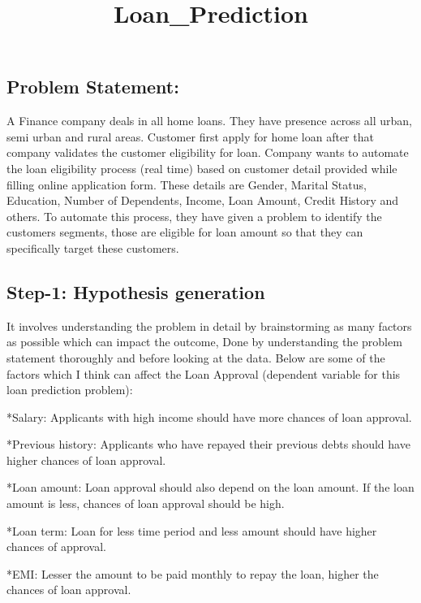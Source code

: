 \documentclass[11pt]{article}
\title{Loan\_Prediction}
\begin{document}
    
    
    \maketitle
    
    

    
    \subsection{Problem Statement:}\label{problem-statement}

A Finance company deals in all home loans. They have presence across all
urban, semi urban and rural areas. Customer first apply for home loan
after that company validates the customer eligibility for loan. Company
wants to automate the loan eligibility process (real time) based on
customer detail provided while filling online application form. These
details are Gender, Marital Status, Education, Number of Dependents,
Income, Loan Amount, Credit History and others. To automate this
process, they have given a problem to identify the customers segments,
those are eligible for loan amount so that they can specifically target
these customers.

    \subsection{Step-1: Hypothesis
generation}\label{step-1-hypothesis-generation}

    It involves understanding the problem in detail by brainstorming as many
factors as possible which can impact the outcome, Done by understanding
the problem statement thoroughly and before looking at the data. Below
are some of the factors which I think can affect the Loan Approval
(dependent variable for this loan prediction problem):

*Salary: Applicants with high income should have more chances of loan
approval.

*Previous history: Applicants who have repayed their previous debts
should have higher chances of loan approval.

*Loan amount: Loan approval should also depend on the loan amount. If
the loan amount is less, chances of loan approval should be high.

*Loan term: Loan for less time period and less amount should have higher
chances of approval.

*EMI: Lesser the amount to be paid monthly to repay the loan, higher the
chances of loan approval.
\end{document}
